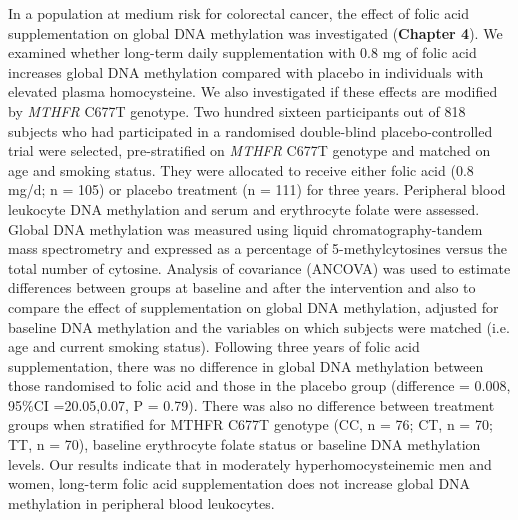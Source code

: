 \noindent In a population at medium risk for colorectal cancer, the effect of folic acid supplementation on global DNA methylation was investigated (\textbf{Chapter 4}). We examined whether long-term daily supplementation with 0.8 mg of folic acid increases global DNA methylation compared with placebo in individuals with elevated plasma homocysteine. We also investigated if these effects are modified by \emph{MTHFR} C677T genotype. Two hundred sixteen participants out of 818 subjects who had participated in a randomised double-blind placebo-controlled trial were selected, pre-stratified on \emph{MTHFR} C677T genotype and matched on age and smoking status. They were allocated to receive either folic acid (0.8 mg/d; n = 105) or placebo treatment (n = 111) for three years. Peripheral blood leukocyte DNA methylation and serum and erythrocyte folate were assessed. Global DNA methylation was measured using liquid chromatography-tandem mass spectrometry and expressed as a percentage of 5-methylcytosines versus the total number of cytosine. Analysis of covariance (ANCOVA) was used to estimate differences between groups at baseline and after the intervention and also to compare the effect of supplementation on global DNA methylation, adjusted for baseline DNA methylation and the variables on which subjects were matched (i.e. age and current smoking status). Following three years of folic acid supplementation, there was no difference in global DNA methylation between those randomised to folic acid and those in the placebo group (difference = 0.008, 95\%CI =20.05,0.07, P = 0.79). There was also no difference between treatment groups when stratified for MTHFR C677T genotype (CC, n = 76; CT, n = 70; TT, n = 70), baseline erythrocyte folate status or baseline DNA methylation levels. Our results indicate that in moderately hyperhomocysteinemic men and women, long-term folic acid supplementation does not increase global DNA methylation in peripheral blood leukocytes.

